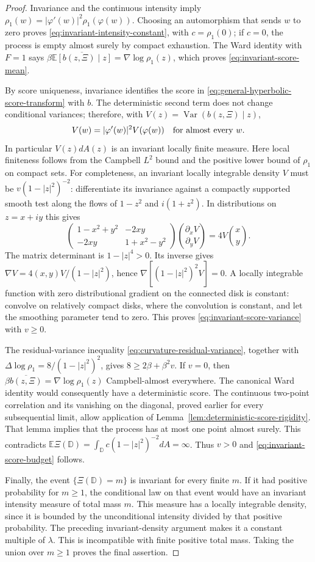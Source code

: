 \documentclass[11pt,a4paper]{article}
\numberwithin{equation}{section}
\theoremstyle{definition}
\theoremstyle{remark}
\newcommand{\D}{\mathbb D}
\newcommand{\E}{\mathbb E}
\begin{document}
\begin{proof}
Invariance and the continuous intensity imply
$\rho_1(w)=|\varphi'(w)|^2\rho_1(\varphi(w))$.
Choosing an automorphism that sends $w$ to zero proves
\eqref{eq:invariant-intensity-constant}, with $c=\rho_1(0)$; if $c=0$,
the process is empty almost surely by compact exhaustion. The Ward
identity with $F=1$ says
$\beta\overline{\E[b(z,\Xi)\mid z]}=\nabla\log\rho_1(z)$,
which proves \eqref{eq:invariant-score-mean}.

By score uniqueness, invariance identifies the score in
\eqref{eq:general-hyperbolic-score-transform} with $b$.
The deterministic second term does not change conditional variances;
therefore, with $V(z)=\operatorname{Var}(b(z,\Xi)\mid z)$,
\[
 V(w)=|\varphi'(w)|^2 V(\varphi(w))
 \quad\hbox{for almost every }w.
\]
In particular $V(z)dA(z)$ is an invariant locally finite measure. Here
local finiteness follows from the Campbell $L^2$ bound and the positive
lower bound of $\rho_1$ on compact sets.
For completeness, an invariant locally integrable density $V$ must be
$v(1-|z|^2)^{-2}$: differentiate its invariance against a compactly
supported smooth test along the flows of $1-z^2$ and $i(1+z^2)$.
In distributions on $z=x+iy$ this gives
\[
 \begin{pmatrix}1-x^2+y^2&-2xy\\-2xy&1+x^2-y^2\end{pmatrix}
 \binom{\partial_xV}{\partial_yV}
       =4V\binom{x}{y}.
\]
The matrix determinant is $1-|z|^4>0$. Its inverse gives
$\nabla V=4(x,y)V/(1-|z|^2)$, hence
$\nabla[(1-|z|^2)^2V]=0$. A locally integrable function with zero
distributional gradient on the connected disk is constant: convolve
on relatively compact disks, where the convolution is constant, and
let the smoothing parameter tend to zero. This proves
\eqref{eq:invariant-score-variance} with $v\ge0$.

The residual-variance inequality
\eqref{eq:curvature-residual-variance}, together with
$\Delta\log\rho_1=8/(1-|z|^2)^2$, gives
$8\ge2\beta+\beta^2v$. If $v=0$, then
$\beta\overline{b(z,\Xi)}=\nabla\log\rho_1(z)$ Campbell-almost
everywhere. The canonical Ward identity would consequently have a
deterministic score. The continuous two-point correlation and its
vanishing on the diagonal, proved earlier for every subsequential
limit, allow application of Lemma~\ref{lem:deterministic-score-rigidity}.
That lemma implies that the process has at most one point almost
surely. This contradicts
$\E\Xi(\D)=\int_\D c(1-|z|^2)^{-2}dA=\infty$.
Thus $v>0$ and \eqref{eq:invariant-score-budget} follows.

Finally, the event $\{\Xi(\D)=m\}$ is invariant for every finite $m$.
If it had positive probability for $m\ge1$, the conditional law on that
event would have an invariant intensity measure of total mass $m$.
This measure has a locally integrable density, since it is bounded by
the unconditional intensity divided by that positive probability.
The preceding invariant-density argument makes it a constant multiple
of $\lambda$. This is incompatible with finite positive total mass.
Taking the union over $m\ge1$ proves the final assertion.
\end{proof}
\end{document}

